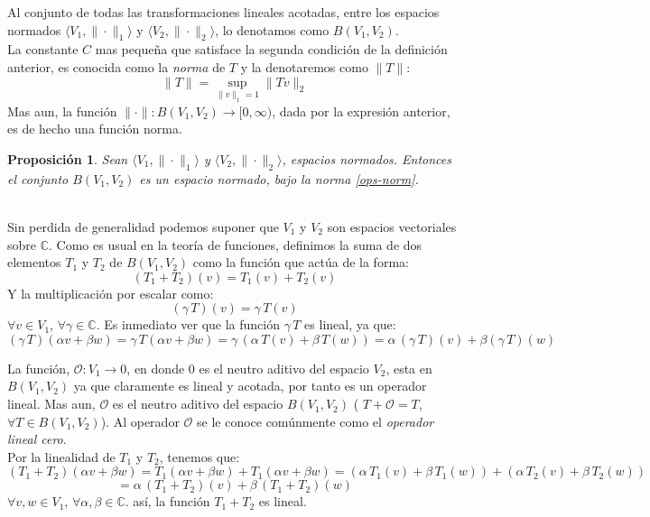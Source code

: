 \documentclass[12pt]{book}
\numberwithin{equation}{chapter}
\newtheorem{proposition}[theorem]{Proposici\'on}
\def\n{\noindent}
\def\C{\mathbb{C}}
\def\la{\langle}
\def\ra{\rangle}
\def\rar{\rightarrow}
\begin{document}
\vspace{3 mm}

Al conjunto de todas las transformaciones lineales acotadas, entre los espacios normados $\la V_{1},\| \cdot \|_{1} \ra$ y $\la V_{2},\| \cdot \|_{2} \ra$, lo denotamos como $B(V_{1},V_{2})$.\\

La constante $C$ mas peque\~na que satisface la segunda condici\'on de la definici\'on anterior, es conocida como la \emph{norma} de $T$ y la denotaremos como $\| T \|$:
\begin{equation}\label{ops-norm}
\| T \|= \sup_{ \|v\|_{1}=1 } \| Tv \|_{2}
\end{equation}
Mas aun, la funci\'on $ \| \cdot \| : B(V_{1},V_{2}) \rar [0,\infty) $, dada por la expresi\'on anterior, es de hecho una funci\'on norma.\\

\begin{proposition}
Sean $\la V_{1},\| \cdot \|_{1} \ra$ y $\la V_{2},\| \cdot \|_{2} \ra$, espacios normados. Entonces el conjunto $B(V_{1},V_{2})$ es un espacio normado, bajo la norma \eqref{ops-norm}.
\end{proposition}
\n {\bf Demostraci\'on}\\
Sin perdida de generalidad podemos suponer que $V_{1}$ y $V_{2}$ son espacios vectoriales sobre $\C$. Como es usual en la teor\'ia de funciones, definimos la suma de dos elementos $T_{1}$ y $T_{2}$ de $B(V_{1},V_{2})$ como la funci\'on que act\'ua de la forma:
$$ (T_{1}+T_{2})(v)= T_{1}(v) + T_{2}(v) $$
Y la multiplicaci\'on por escalar como:
$$ ( \gamma \, T)(v) = \gamma \, T(v)  $$
$ \forall v \in V_{1} $, $\forall \gamma \in \C$. Es inmediato ver que la funci\'on $\gamma \, T$ es lineal, ya que:
$$ ( \gamma \, T)(\alpha v + \beta w) = \gamma \, T(\alpha v + \beta w) =\gamma \,( \alpha \, T(v) + \beta \, T(w) ) = \alpha \,(\gamma\, T)(v) + \beta (\gamma \, T)(w) $$

La funci\'on, $\mathcal{O}: V_{1} \rar 0 $, en donde $0$ es el neutro aditivo del espacio $V_{2}$, esta en $B(V_{1},V_{2})$ ya que claramente es lineal y acotada, por tanto es un operador lineal. Mas aun, $\mathcal{O}$ es el neutro aditivo del espacio $B(V_{1},V_{2})$ ( $T+\mathcal{O} = T$, $ \forall T \in B(V_{1},V_{2}) $). Al operador $\mathcal{O}$ se le conoce com\'unmente como el \emph{operador lineal cero}.\\ 
Por la linealidad de $T_{1}$ y $T_{2}$, tenemos que:
$$ (T_{1}+T_{2})(\alpha v + \beta w)= T_{1}(\alpha v + \beta w) + T_{1}(\alpha v + \beta w) = ( \alpha \, T_{1}(v) + \beta \, T_{1}(w) )+( \alpha \, T_{2}(v) + \beta \, T_{2}(w) ) $$
$$= \alpha \,(T_{1}+T_{2})(v) + \beta \,(T_{1}+T_{2})(w) $$
$\forall v,w \in V_{1}$, $\forall \alpha,\beta \in \mathbb{C}$. as\'i, la funci\'on $T_{1}+T_{2}$ es lineal.\\
\end{document}
